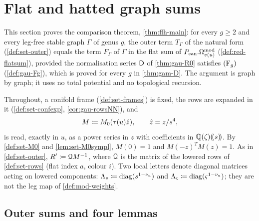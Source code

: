 \section{Flat and hatted graph sums}
\label{sec:flh}

This section proves the comparison theorem, \cref{thm:flh-main}: for every $g\geq 2$ and every leg-free stable graph $\Gamma$ of genus $g$, the outer term $T_\Gamma$ of the natural form (\cref{def:set-outer}) equals the term $F_\Gamma$ of $\Gamma$ in the flat sum of $P_{\mathrm{can}}.\Omega^{\mathrm{mod}}_{v(u)}$ (\cref{def:red-flatsum}), provided the normalisation series $\mathsf{D}$ of \cref{thm:gau-R0} satisfies $(\mathrm{F}_{g})$ (\cref{def:gau-Fg}), which is proved for every $g$ in \cref{thm:gam-D}. The argument is graph by graph; it uses no total potential and no topological recursion.

Throughout, a conifold frame (\cref{def:set-frames}) is fixed, the rows are expanded in it (\cref{def:set-confexp}, \cref{cor:gau-rowsNN}), and
\[
M\coloneqq M_{0}(\tau(u)\hat{z}),\qquad \hat{z}=z/s^4,
\]
is read, exactly in $u$, as a power series in $z$ with coefficients in $\mathbb{Q}(\zeta)(\!(s)\!)$. By \cref{def:set-M0} and \cref{lem:set-M0sympl}, $M(0)=1$ and $M(-z)^TM(z)=1$. As in \cref{def:set-outer}, $R'\coloneqq\mathcal{Q} M^{-1}$, where $\mathcal{Q}$ is the matrix of the lowered rows of \cref{def:set-rows} (flat index $a$, colour $i$). Two local letters denote diagonal matrices acting on lowered components: $\Lambda_s\coloneqq\operatorname{diag}(s^{1-\nu_a})$ and $\Lambda_\varsigma\coloneqq\operatorname{diag}(\varsigma^{1-\nu_a})$; they are not the leg map of \cref{def:mod-weights}.

\subsection{Outer sums and four lemmas}
\label{sec:flh-lemmas}

